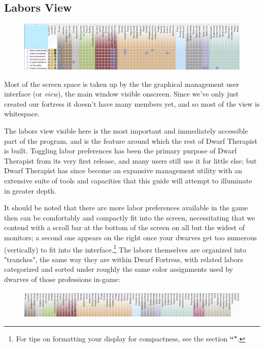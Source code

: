 \documentclass[]{article}
\begin{document}
\subsection{Labors View}
\label{sec:Labors View}
\begin{figure}[h!] \centering \includegraphics[width=\linewidth]{Sec1Fig5}
\end{figure}
Most of the screen space is taken up by the the graphical management user interface
(or \emph{view}), the main window visible onscreen. Since we've only just created our fortress it doesn't
have many members yet, and so most of the view is whitespace.

The labors view visible here is the most important and immediately accessible part of the program,
and is the feature around which the rest of Dwarf Therapist is built. Toggling labor preferences has been
the primary purpose of Dwarf Therapist from its very first release, and many users still use it for
little else; but Dwarf Therapist has since become an expansive management utility with an
extensive suite of tools and capacities that this guide will attempt to illuminate in greater depth.

It should be noted that there are more labor preferences available in the game
then can be comfortably and compactly fit into the screen, necessitating that we contend with a scroll
bar at the bottom of the screen on all but the widest of monitors; a second one appears on the right once
your dwarves get too numerous (vertically) to fit into the interface.\footnote{For tips on
formatting your display for compactness, see the section \textbf{``"}.} The labors themselves are organized into "tranches", the same way they are within
Dwarf Fortress, with related labors categorized and sorted under roughly the same color assignments used
by dwarves of those professions in-game:
\begin{figure}[h!] \centering \includegraphics[width=\linewidth]{Sec1Fig6}
\end{figure}
\end{document}

